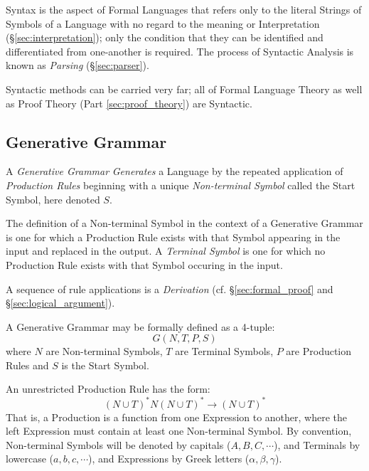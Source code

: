 Syntax is the aspect of Formal Languages that refers only to the
literal Strings of Symbols of a Language with no regard to the meaning
or Interpretation (\S\ref{sec:interpretation}); only the condition
that they can be identified and differentiated from one-another is
required. The process of Syntactic Analysis is known as \emph{Parsing}
(\S\ref{sec:parser}).

Syntactic methods can be carried very far; all of Formal Language
Theory as well as Proof Theory (Part \ref{sec:proof_theory}) are
Syntactic.



\subsection{Generative Grammar}\label{sec:generative_grammar}

A \emph{Generative Grammar} \emph{Generates} a Language by the
repeated application of \emph{Production Rules} beginning with a
unique \emph{Non-terminal Symbol} called the Start Symbol, here
denoted $S$.

The definition of a Non-terminal Symbol in the context of a Generative
Grammar is one for which a Production Rule exists with that Symbol
appearing in the input and replaced in the output. A \emph{Terminal
  Symbol} is one for which no Production Rule exists with that Symbol
occuring in the input.

A sequence of rule applications is a \emph{Derivation} (cf.
\S\ref{sec:formal_proof} and \S\ref{sec:logical_argument}).

A Generative Grammar may be formally defined as a 4-tuple:
\[
    G(N,T,P,S)
\]
where $N$ are Non-terminal Symbols, $T$ are Terminal Symbols, $P$ are
Production Rules and $S$ is the Start Symbol.

An unrestricted Production Rule has the form:
\[
    (N \cup T)^*N(N \cup T)^* \rightarrow (N \cup T)^*
\]
That is, a Production is a function from one Expression to
another, where the left Expression must contain at least one
Non-terminal Symbol. By convention, Non-terminal Symbols
will be denoted by capitals ($A,B,C,\cdots$), and Terminals by
lowercase ($a,b,c,\cdots$), and Expressions by Greek letters
($\alpha,\beta,\gamma$).



